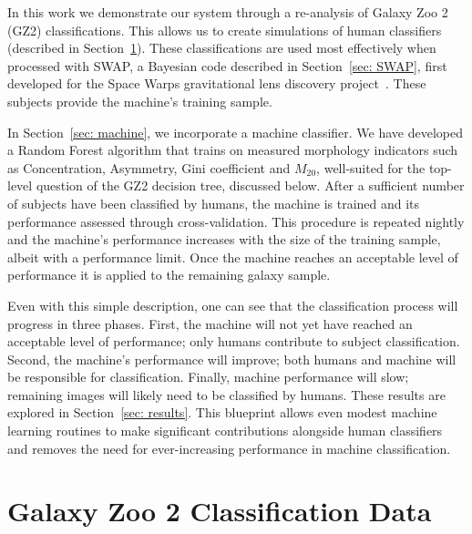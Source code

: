 \documentclass[twocolumn,  trackchanges,]{aastex6}%
\newcommand{\M}[1]{$M_{\mathrm{#1}}$}
\begin{document}
In this work we demonstrate our system through a re-analysis of  Galaxy Zoo 2 (GZ2)
 classifications. This allows us to  create simulations of human classifiers (described in
 Section~\ref{sec: data}). These classifications are used most effectively when processed 
with SWAP, a Bayesian code described in Section~\ref{sec: SWAP}, first developed 
for the Space Warps gravitational lens discovery project~\citep{Marshall2016}. 
These subjects provide the machine's training sample. 

In Section~\ref{sec: machine}, we incorporate a machine classifier. We have 
developed a Random Forest algorithm that trains on measured morphology 
indicators such as Concentration, Asymmetry, Gini coefficient and 
\M{20}, well-suited for the top-level question of the GZ2 decision tree, 
discussed below. After a sufficient number of subjects have been classified 
by humans,  the machine is trained and its performance assessed through 
cross-validation. This procedure is repeated nightly and the machine's performance 
increases with the size of the training sample, albeit with a performance limit. 
Once the machine reaches an acceptable level of performance it is applied to the 
remaining galaxy sample. 

Even with this simple description, one can see that the classification process 
will progress in three phases.  First, the machine will not yet have reached an 
acceptable level of performance; only humans contribute to subject classification. 
Second, the machine's performance will improve; both humans and machine will 
be responsible for classification. Finally, machine performance will slow; 
remaining images will likely need to be classified by humans. These results are 
explored in  Section~\ref{sec: results}. This blueprint allows even modest 
machine learning routines to make significant contributions alongside human 
classifiers and removes the need for ever-increasing performance in machine classification.



\section{Galaxy Zoo 2 Classification Data} \label{sec: data}
\end{document}
